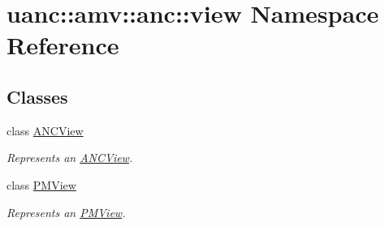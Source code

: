 \hypertarget{namespaceuanc_1_1amv_1_1anc_1_1view}{}\section{uanc\+:\+:amv\+:\+:anc\+:\+:view Namespace Reference}
\label{namespaceuanc_1_1amv_1_1anc_1_1view}
\subsection*{Classes}
\begin{DoxyCompactItemize}
\item 
class \hyperlink{classuanc_1_1amv_1_1anc_1_1view_1_1_a_n_c_view}{A\+N\+C\+View}
\begin{DoxyCompactList}\small\item\em Represents an \hyperlink{classuanc_1_1amv_1_1anc_1_1view_1_1_a_n_c_view}{A\+N\+C\+View}. \end{DoxyCompactList}\item 
class \hyperlink{classuanc_1_1amv_1_1anc_1_1view_1_1_p_m_view}{P\+M\+View}
\begin{DoxyCompactList}\small\item\em Represents an \hyperlink{classuanc_1_1amv_1_1anc_1_1view_1_1_p_m_view}{P\+M\+View}. \end{DoxyCompactList}\end{DoxyCompactItemize}
